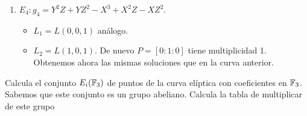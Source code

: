 \documentclass[twoside]{article}
\begin{document}
\begin{solucion}
\begin{enumerate}
 \item $E_4: g_4=Y^2Z + YZ^2 - X^3 + X^2Z - XZ^2$.
 \begin{itemize}
 \item $L_1=L(0,0,1)$ análogo.
 \item $L_2=L(1,0,1)$. De nuevo $P=[0:1:0]$ tiene multiplicidad 1. Obtenemos ahora las mismas soluciones que en la curva anterior. 
 \end{itemize}
\end{enumerate}
\end{solucion}

\newpage

\begin{ejercicio}{8}
 Calcula el conjunto $E_i(\mathbb{F}_3)$ de puntos de la curva elíptica con coeficientes en $\mathbb{F}_3$.
Sabemos que este conjunto es un grupo abeliano. Calcula la tabla de multiplicar de este grupo
\end{ejercicio}
\end{document}

